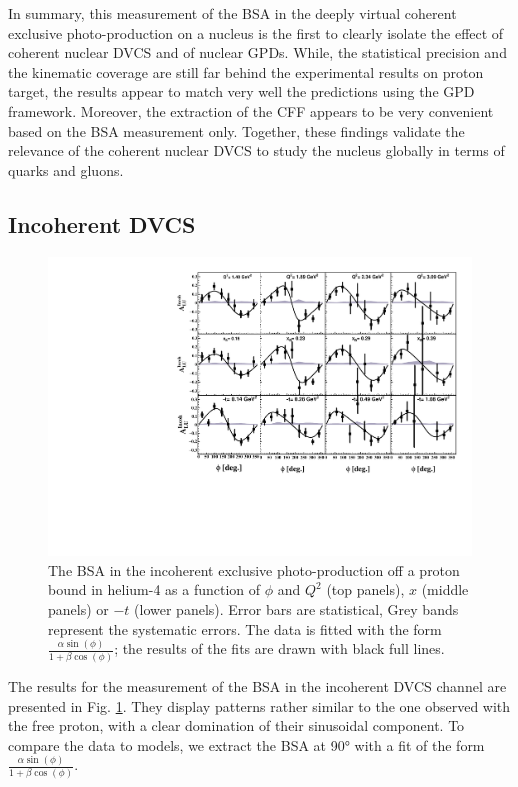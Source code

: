 \documentclass[aps,prc,preprint,superscriptaddress]{revtex4}
\begin{document}
In summary, this measurement of the BSA in the deeply virtual coherent exclusive 
photo-production on a nucleus is the first to clearly isolate the effect of 
coherent nuclear DVCS and of nuclear GPDs. While, the statistical precision and 
the kinematic coverage are still far behind the experimental results on
proton target, the results appear to match very well the predictions using the GPD 
framework. Moreover, the extraction of the CFF appears to be very convenient based
on the BSA measurement only. Together, these findings  validate the relevance of the 
coherent nuclear DVCS to study the nucleus globally in terms of quarks and 
gluons. 

\subsection{Incoherent DVCS}

\begin{figure}[bp!]
\center
\includegraphics[width=15cm]{fig3/incoherent_ALU_phi.pdf}
	\caption{The BSA in the incoherent exclusive photo-production off a proton bound in
	helium-4 as a function of $\phi$ and $Q^2$ 
	(top panels), $x$ (middle panels) or $-t$ (lower panels). Error bars are  
	statistical, Grey bands represent the systematic errors. The data is fitted with the 
	form $\frac{\alpha \sin(\phi)}{1+\beta \cos(\phi)}$; the results of the 
	fits are drawn with black full lines.}
\label{fig:InCohALUphi}
\end{figure}

The results for the measurement of the BSA in the incoherent DVCS channel are presented in
Fig. \ref{fig:InCohALUphi}. They display patterns rather similar to the one observed with the 
free proton, with a clear domination of their sinusoidal component. To compare the data to 
models, we extract the BSA at 90° with a fit of the form $\frac{\alpha \sin(\phi)}{1+\beta \cos(\phi)}$. 
\end{document}
